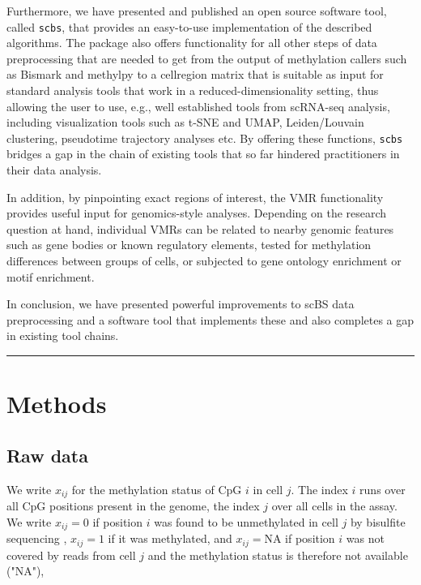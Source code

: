 \documentclass[twocolumn,10pt]{article}
\begin{document}
Furthermore, we have presented and published an open source software tool, called \texttt{scbs}, that provides an easy-to-use implementation of the described algorithms. The package also offers functionality for all other steps of data preprocessing that are needed to get from the output of methylation callers such as Bismark and methylpy to a cell\texttimes region matrix that is suitable as input for standard analysis tools that work in a reduced-dimensionality setting, thus allowing the user to use, e.g., well established tools from scRNA-seq analysis, including visualization tools such as t-SNE and UMAP, Leiden/Louvain clustering, pseudotime trajectory analyses etc. By offering these functions, \texttt{scbs} bridges a gap in the chain of existing tools that so far hindered practitioners in their data analysis.

In addition, by pinpointing exact regions of interest, the VMR functionality provides useful input for genomics-style analyses.
Depending on the research question at hand, individual VMRs can be related to nearby genomic features such as gene bodies or known regulatory elements, tested for methylation differences between groups of cells, or subjected to gene ontology enrichment or motif enrichment.

In conclusion, we have presented powerful improvements to scBS data preprocessing and a software tool that implements these and also completes a gap in existing tool chains.

\vspace{1.6ex}
\noindent\hfil\rule{.6\columnwidth}{.2pt}\hfil

\section{Methods}

\subsection{Raw data}

We write $x_{ij}$ for the methylation status of CpG $i$ in cell $j$. The index $i$ runs over all CpG positions present in the genome, the index $j$ over all cells in the assay. We write $x_{ij}=0$ if position $i$ was found to be unmethylated in cell $j$ by bisulfite sequencing , $x_{ij}=1$ if it was methylated, and $x_{ij}=\text{NA}$ if position $i$ was not covered by reads from cell $j$ and the methylation status is therefore not available ("NA"),
\end{document}
